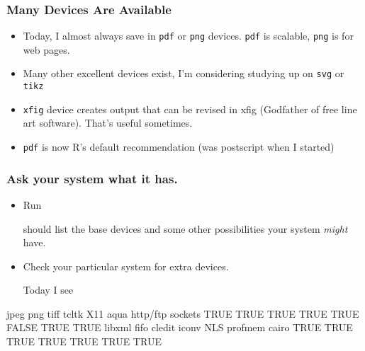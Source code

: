 \documentclass[11pt,english]{beamer}
\begin{document}

\begin{frame}
  \frametitle {Many Devices Are Available}

  \begin{itemize}

    \item Today, I almost always save in  \texttt{pdf} or \texttt{png}
      devices. \texttt{pdf} is scalable, \texttt{png} is for web pages.
    \item Many other excellent devices exist, I'm considering studying
      up on \texttt{svg} or \texttt{tikz}
    \item \texttt{xfig} device creates output that can be revised in
      xfig (Godfather of free line art software). That's useful sometimes.
    \item \texttt{pdf} is now R's default recommendation (was
      postscript when I started)

  \end{itemize}
\end{frame}


\begin{frame}[containsverbatim]
  \frametitle {Ask your system what it has.}

  \begin{itemize}
    \item Run

    should list the base devices and some other possibilities your
    system \emph{might} have.

    \item Check your particular system for extra devices.

Today I see
     \end{itemize}

\def\Sweavesize{\scriptsize}
\begin{Schunk}
\begin{Soutput}
jpeg      png     tiff    tcltk      X11     aqua http/ftp  sockets
TRUE     TRUE     TRUE     TRUE     TRUE    FALSE     TRUE     TRUE
libxml     fifo   cledit    iconv      NLS  profmem    cairo
TRUE     TRUE     TRUE     TRUE     TRUE     TRUE     TRUE
\end{Soutput}
\end{Schunk}

\end{frame}

\end{document}
